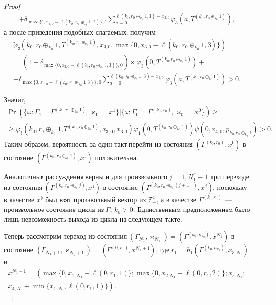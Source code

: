 \documentclass{report}
\begin{document}
\begin{proof}
\begin{multline*}
+\delta_{\max{\{0,x_{3,0} - \ell(k_0,r_0\oplus_{k_0}1,3)\}},0} \sum_{a=0}^{\ell(k_0,r_0\oplus_{k_0}1,3)-x_{3,0}}\varphi_3 (a,T^{(k_0,r_0\oplus_{k_0}1)}),
\end{multline*}
а после приведения подобных слагаемых, получим
\begin{multline*}
\widetilde{\varphi}_3(k_0,r_0\oplus_{k_0}1,T^{(k_0,r_0\oplus_{k_0}1)},x_{3,0},\max{\{0,x_{3,0} - \ell(k_0,r_0\oplus_{k_0}1,3)\}})=\\=(1-\delta_{\max{\{0,x_{3,0} - \ell(k_0,r_0\oplus_{k_0}1,3)\}},0}) \times \varphi_3(0,T^{(k_0,r_0\oplus_{k_0}1)} ) +\\
+\delta_{\max{\{0,x_{3,0} - \ell(k_0,r_0\oplus_{k_0}1,3)\}},0} \sum_{a=0}^{\ell(k_0,r_0\oplus_{k_0}1,3)-x_{3,0}}\varphi_3 (a,T^{(k_0,r_0\oplus_{k_0}1)})>0.
\end{multline*}

Значит,
\begin{multline*}
\Pr (\{\omega\colon \Gamma_{1}=\Gamma^{(k_0,r_0\oplus_{k_0}1)},\varkappa_{1}=x^1\} | \{\omega\colon \Gamma_{0}=\Gamma^{(k_0,r_0)},\varkappa_0=x^0\})\geqslant \\
\geqslant \widetilde{\varphi}_3(k_0,r_0\oplus_{k_0}1,T^{(k_0,r_0\oplus_{k_0}1)},x_{3,0},x_{3,1})
\varphi_1(0,T^{(k_0,r_0\oplus_{k_0}1)})  \psi(0,x_{4,0}, p_{k_0,r_0\oplus_{k_0}1}) > 0.
\end{multline*}
Таким образом, вероятность за один такт перейти из состояния $(\Gamma^{(k_0,r_0)}, x^0)$ в состояние $ (\Gamma^{(k_0,r_0\oplus_{k_0}1)}, x^1)$ положительна.

Аналогичные рассуждения верны и для произвольного $j=\overline{1,N_1-1}$
при переходе из состояния $(\Gamma^{(k_0,r_0\oplus_{k_0} j)},x^j)$ в состояние $(\Gamma^{(k_0,r_0\oplus_{k_0}(j+1))},x^j)$, поскольку в качестве $x^0$ был взят произвольный вектор из $\mathbb{Z}_+^4$, а в качестве $\Gamma^{(k_0,r_0)}$ --- произвольное состояние цикла из $\Gamma$, $k_0>0$. Единственным предположением было лишь невозможность выхода из цикла на следующем такте.

Теперь рассмотрим переход из состояния $(\Gamma_{N_1},\varkappa_{N_1}) = (\Gamma^{(k_0,n_{k_0})},x^{N_1})$ в состояние $(\Gamma_{N_1+1},\varkappa_{N_1+1}) = (\Gamma^{(0,r_1)},x^{N_1+1})$, где $r_1 = h_1(\Gamma^{(k_0,n_{k_0})},x_{3,N_1})$ и 
\begin{multline*}
x^{N_1+1}=\left(\max{\{0,x_{1,N_1} - \ell(0,r_1,1)\}};
\max{\{0,x_{2,N_1} - \ell(0,r_1,2)\}};x_{3,N_1};\right.\\
\left.
x_{4,N_1} + \min{\{x_{1,N_1}, \ell(0,r_1,1)\}}\right).
\end{multline*}


\end{proof}
\end{document}
